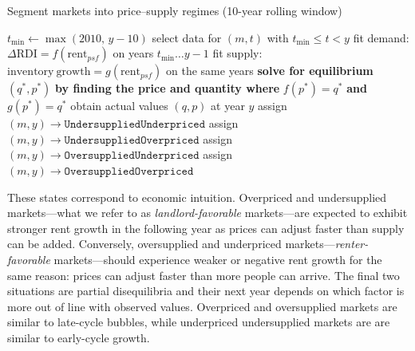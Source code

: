 \documentclass[APA,Times1COL]{WileyNJDv5} %
\begin{document}
 
\FloatBarrier
\begin{algorithm}
	\caption{\enskip Segment markets into price–supply regimes (10-year rolling window)}%
	\label{alg:market_segmentation}
	\begin{algorithmic}[1]
		\State $t_{\min}\gets \max(2010,\,y-10)$
		\State select data for $(m,t)$ with $t_{\min}\le t < y$
		\State fit demand: $\Delta\mathrm{RDI} = f(\mathrm{rent}_{psf})$ on years $t_{\min}\ldots y-1$
		\State fit supply: $\mathrm{inventory\ growth} = g(\mathrm{rent}_{psf})$ on the same years
		\State \textbf{solve for equilibrium} $(q^*,p^*)$ \textbf{by finding the price and quantity where}
		$f(p^*) = q^*$ \textbf{and} $g(p^*) = q^*$
		\State obtain actual values $(q,p)$ at year $y$
		\State assign $(m,y)\to\texttt{UndersuppliedUnderpriced}$
		\Else
		\State assign $(m,y)\to\texttt{UndersuppliedOverpriced}$
		\EndIf
		\Else
		\State assign $(m,y)\to\texttt{OversuppliedUnderpriced}$
		\Else
		\State assign $(m,y)\to\texttt{OversuppliedOverpriced}$
		\EndIf
		\EndIf
		\EndFor
		\EndFor
	\end{algorithmic}
\end{algorithm}
\FloatBarrier
These states correspond to economic intuition. Overpriced and undersupplied markets---what we refer to as \textit{landlord-favorable} markets---are expected to exhibit stronger rent growth in the following year as prices can adjust faster than supply can be added. Conversely, oversupplied and underpriced markets---\textit{renter-favorable} markets---should experience weaker or negative rent growth for the same reason: prices can adjust faster than more people can arrive. The final two situations are partial disequilibria and their next year depends on which factor is more out of line with observed values. Overpriced and oversupplied markets are similar to late-cycle bubbles, while underpriced undersupplied markets are are similar to early-cycle growth. 
\end{document}
